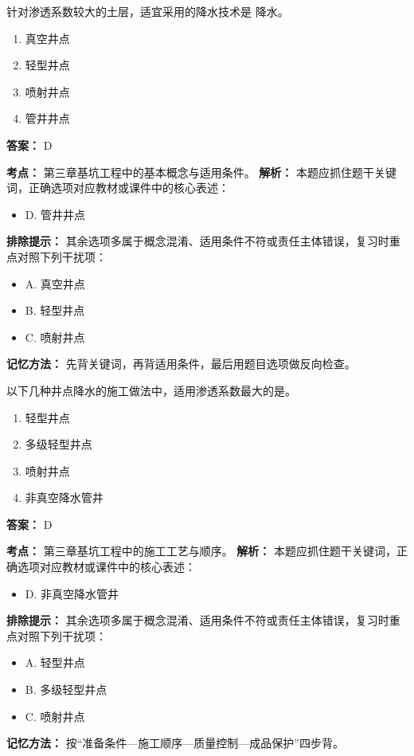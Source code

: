 \documentclass[UTF8,fontset=fandol,11pt]{ctexart}
\begin{document}
\begin{quizbox}[title={第 15 题}]
针对渗透系数较大的土层，适宜采用的降水技术是 降水。\\
\begin{enumerate}[label=\Alph*.]
\item 真空井点
\item 轻型井点
\item 喷射井点
\item 管井井点
\end{enumerate}
\textbf{答案：} D
\vspace{0.25em}
\begin{answerbox}[title={考点解析}]
\textbf{考点：} 第三章基坑工程中的基本概念与适用条件。
\textbf{解析：} 本题应抓住题干关键词，正确选项对应教材或课件中的核心表述：
\begin{itemize}
\item D. 管井井点
\end{itemize}
\textbf{排除提示：} 其余选项多属于概念混淆、适用条件不符或责任主体错误，复习时重点对照下列干扰项：
\begin{itemize}
\item A. 真空井点
\item B. 轻型井点
\item C. 喷射井点
\end{itemize}
\textbf{记忆方法：} 先背关键词，再背适用条件，最后用题目选项做反向检查。
\end{answerbox}
\end{quizbox}

\begin{quizbox}[title={第 16 题}]
以下几种井点降水的施工做法中，适用渗透系数最大的是。\\
\begin{enumerate}[label=\Alph*.]
\item 轻型井点
\item 多级轻型井点
\item 喷射井点
\item 非真空降水管井
\end{enumerate}
\textbf{答案：} D
\vspace{0.25em}
\begin{answerbox}[title={考点解析}]
\textbf{考点：} 第三章基坑工程中的施工工艺与顺序。
\textbf{解析：} 本题应抓住题干关键词，正确选项对应教材或课件中的核心表述：
\begin{itemize}
\item D. 非真空降水管井
\end{itemize}
\textbf{排除提示：} 其余选项多属于概念混淆、适用条件不符或责任主体错误，复习时重点对照下列干扰项：
\begin{itemize}
\item A. 轻型井点
\item B. 多级轻型井点
\item C. 喷射井点
\end{itemize}
\textbf{记忆方法：} 按“准备条件—施工顺序—质量控制—成品保护”四步背。
\end{answerbox}
\end{quizbox}
\end{document}

